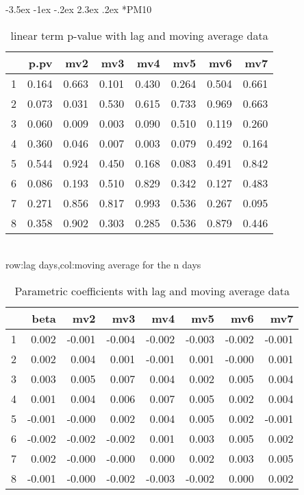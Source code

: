 \documentclass[a4paper, 12pt]{article}
\makeatletter
\def\large{\fontsize{14}{20}\selectfont}
\renewcommand\subsection{\@startsection {subsection}{1}{\z@}%
                                   {-3.5ex \@plus -1ex \@minus -.2ex}%
                                   {2.3ex \@plus.2ex}%
                                   {\centering\normalfont\large\bfseries}}
\makeatother
\begin{document}
\subsection*{PM10}
\begin{table}[h]
\centering
\caption{linear term p-value with lag and moving average data}
\begin{tabular}{rrrrrrrr}
  \hline
 & p.pv & mv2 & mv3 & mv4 & mv5 & mv6 & mv7 \\
  \hline
1 & 0.164 & 0.663 & 0.101 & 0.430 & 0.264 & 0.504 & 0.661 \\
  2 & 0.073 & 0.031 & 0.530 & 0.615 & 0.733 & 0.969 & 0.663 \\
  3 & 0.060 & 0.009 & 0.003 & 0.090 & 0.510 & 0.119 & 0.260 \\
  4 & 0.360 & 0.046 & 0.007 & 0.003 & 0.079 & 0.492 & 0.164 \\
  5 & 0.544 & 0.924 & 0.450 & 0.168 & 0.083 & 0.491 & 0.842 \\
  6 & 0.086 & 0.193 & 0.510 & 0.829 & 0.342 & 0.127 & 0.483 \\
  7 & 0.271 & 0.856 & 0.817 & 0.993 & 0.536 & 0.267 & 0.095 \\
  8 & 0.358 & 0.902 & 0.303 & 0.285 & 0.536 & 0.879 & 0.446 \\
   \hline
\end{tabular}
\\row:lag days,col:moving average for the n days
\end{table}

\begin{table}[h]
\centering
\caption{Parametric coefficients with lag and moving average data}
\begin{tabular}{rrrrrrrr}
  \hline
 & beta & mv2 & mv3 & mv4 & mv5 & mv6 & mv7 \\
  \hline
1 & 0.002 & -0.001 & -0.004 & -0.002 & -0.003 & -0.002 & -0.001 \\
  2 & 0.002 & 0.004 & 0.001 & -0.001 & 0.001 & -0.000 & 0.001 \\
  3 & 0.003 & 0.005 & 0.007 & 0.004 & 0.002 & 0.005 & 0.004 \\
  4 & 0.001 & 0.004 & 0.006 & 0.007 & 0.005 & 0.002 & 0.004 \\
  5 & -0.001 & -0.000 & 0.002 & 0.004 & 0.005 & 0.002 & -0.001 \\
  6 & -0.002 & -0.002 & -0.002 & 0.001 & 0.003 & 0.005 & 0.002 \\
  7 & 0.002 & -0.000 & -0.000 & 0.000 & 0.002 & 0.003 & 0.005 \\
  8 & -0.001 & -0.000 & -0.002 & -0.003 & -0.002 & 0.000 & 0.002 \\
   \hline
\end{tabular}
\end{table}
\clearpage
\end{document}
